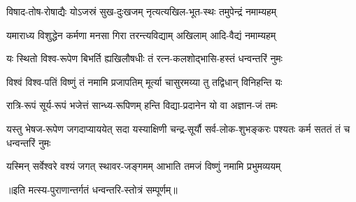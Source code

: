 \twolineshloka
{विषाद-तोष-रोषाद्यैः योऽजस्रं सुख-दुःखजम्}
{नृत्यत्यखिल-भूत-स्थः तमुपेन्द्रं नमाम्यहम्}%

\twolineshloka
{यमाराध्य विशुद्धेन कर्मणा मनसा गिरा}
{तरन्त्यविद्याम् अखिलाम् आदि-वैद्यं नमाम्यहम्}%

\twolineshloka
{यः स्थितो विश्व-रूपेण बिभर्ति ह्यखिलौषधीः}
{तं रत्न-कलशोद्भासि-हस्तं धन्वन्तरिं नुमः}%

\twolineshloka
{विश्वं विश्व-पतिं विष्णुं तं नमामि प्रजापतिम्}
{मूर्त्या चासुरमय्या तु तद्विधान् विनिहन्ति यः}%

\twolineshloka
{रात्रि-रूपं सूर्य-रूपं भजेत्तं सान्ध्य-रूपिणम्}
{हन्ति विद्या-प्रदानेन यो वा अज्ञान-जं तमः}%

\threelineshloka
{यस्तु भेषज-रूपेण जगदाप्याययेत् सदा}
{यस्याक्षिणी चन्द्र-सूर्यौ सर्व-लोक-शुभङ्करः}
{पश्यतः कर्म सततं तं च धन्वन्तरिं नुमः}%

\twolineshloka
{यस्मिन् सर्वेश्वरे वश्यं जगत् स्थावर-जङ्गमम्}
{आभाति तमजं विष्णुं नमामि प्रभुमव्ययम्}%

॥इति मत्स्य-पुराणान्तर्गतं धन्वन्तरि-स्तोत्रं सम्पूर्णम्॥
